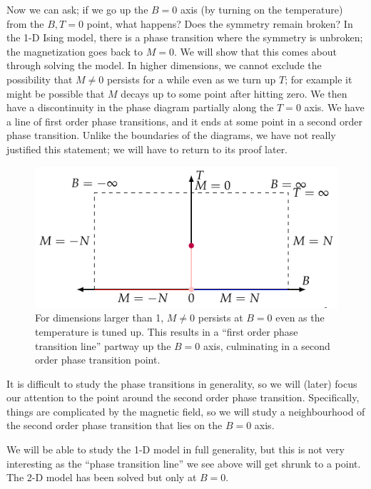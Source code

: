 Now we can ask; if we go up the $B = 0$ axis (by turning on the temperature) from the $B, T = 0$ point, what happens? Does the symmetry remain broken? In the 1-D Ising model, there is a phase transition where the symmetry is unbroken; the magnetization goes back to $M = 0$. We will show that this comes about through solving the model. In higher dimensions, we cannot exclude the possibility that $M \neq 0$ persists for a while even as we turn up $T$; for example it might be possible that $M$ decays up to some point after hitting zero. We then have a discontinuity in the phase diagram partially along the $T = 0$ axis. We have a line of first order phase transitions, and it ends at some point in a second order phase transition. Unlike the boundaries of the diagrams, we have not really justified this statement; we will have to return to its proof later. 

\begin{figure}[htbp]
    \centering
    \includegraphics{Images/fig-IsingphasediagramB0.pdf}
    \caption{For dimensions larger than 1, $M \neq 0$ persists at $B = 0$ even as the temperature is tuned up. This results in a ``first order phase transition line'' partway up the $B = 0$ axis, culminating in a second order phase transition point.}
    \label{fig-IsingphasediagramB0}
\end{figure}

It is difficult to study the phase transitions in generality, so we will (later) focus our attention to the point around the second order phase transition. Specifically, things are complicated by the magnetic field, so we will study a neighbourhood of the second order phase transition that lies on the $B = 0$ axis.

We will be able to study the 1-D model in full generality, but this is not very interesting as the ``phase transition line'' we see above will get shrunk to a point. The 2-D model has been solved but only at $B = 0$. 

